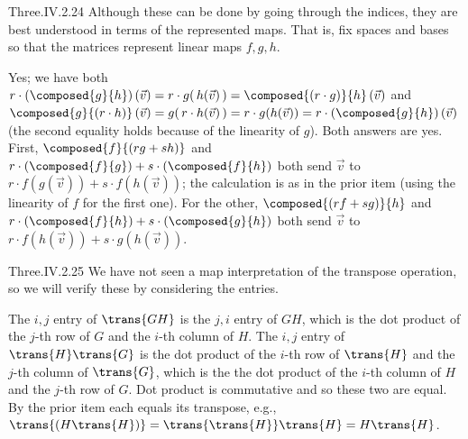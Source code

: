 \begin{ans}{Three.IV.2.24}
      Although these can be done by going through the indices, they
      are best understood in terms of the represented maps.
      That is, fix spaces and bases so that the matrices
      represent linear maps $f,g,h$.
       \begin{exparts}
        \partsitem Yes;  we have both
          $r\cdot (\composed{g}{h})\,(\vec{v})
           =r\cdot g(\,h(\vec{v})\,)
           =\composed{(r\cdot g)}{h}\,(\vec{v})$
          and
          $\composed{g}{(r\cdot h)}\,(\vec{v})=g(\,r\cdot h(\vec{v})\,)
            =r\cdot g(h(\vec{v}))
            =r\cdot (\composed{g}{h})\,(\vec{v})$
          (the second equality holds because of the linearity of $g$).
        \partsitem Both answers are yes.
          First, $\composed{f}{(rg+sh)}$ and
          $r\cdot(\composed{f}{g})+s\cdot(\composed{f}{h})$ both send
          $\vec{v}$ to $r\cdot f(g(\vec{v}))+s\cdot f(h(\vec{v}))$; the
          calculation is as in the prior item
          (using the linearity of $f$ for the first one).
          For the other,
          $\composed{(rf+sg)}{h}$ and
          $r\cdot(\composed{f}{h})+s\cdot(\composed{g}{h})$ both send
          $\vec{v}$ to $r\cdot f(h(\vec{v}))+s\cdot g(h(\vec{v}))$.
      \end{exparts}
    
\end{ans}
\begin{ans}{Three.IV.2.25}
      We have not seen a map interpretation of the transpose operation, so
      we will verify these by considering the entries.
      \begin{exparts}
        \partsitem  The \( i,j \) entry of \( \trans{GH} \) is the $j,i$ entry
          of $GH$, which is the dot product of the
          \( j \)-th row of \( G \) and the \( i \)-th column of \( H \).
          The \( i,j \) entry of \( \trans{H}\trans{G} \) is the dot product of
          the \( i \)-th row of \( \trans{H} \) and the \( j \)-th column of
          \( \trans{G} \), which is the
          the dot product of the \( i \)-th column of \( H \) and the
          \( j \)-th row of \( G \).
          Dot product is commutative and so these two are equal.
        \partsitem By the prior item each equals its transpose, e.g.,
          $\trans{(H\trans{H})}=\trans{\trans{H}}\trans{H}=H\trans{H}$.
      \end{exparts}
    
\end{ans}
